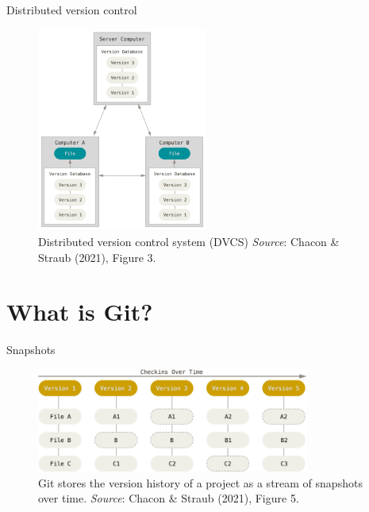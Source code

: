 \documentclass[handout]{beamer}
\begin{document}
\begin{frame}{Distributed version control}
  \begin{figure}
	  \includegraphics[width=0.5\textwidth]{figures/fig3_dvcs.png}
	  \caption{Distributed version control system (DVCS) \textit{Source}: Chacon \& Straub (2021), Figure 3.}
  \end{figure} 
\end{frame}


\section{What is Git?}

\begin{frame}{Snapshots}
  \begin{figure}
	  \includegraphics[width=0.8\textwidth]{figures/fig5_snapshots.png}
	  \caption{Git stores the version history of a project as a stream of snapshots over time. \textit{Source}: Chacon \& Straub (2021), Figure 5.}
  \end{figure} 
\end{frame}
\end{document}
